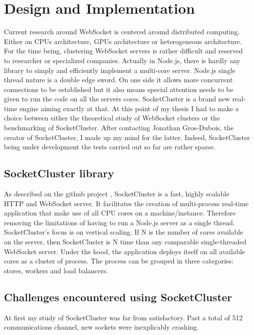 
\chapter{Design and Implementation} 
\label{Chapter2} 

Current research around WebSocket is centered around distributed computing. Either
on CPUs architecture, GPUs architecture or heterogeneous architecture. For the
time being, clustering WebSocket servers is rather difficult and reserved to
researcher or specialized companies. Actually in Node.js, there is hardly any
library to simply and efficiently implement a multi-core server.  Node.js
single thread nature is a double edge sword. On one side it allows more
concurrent connections to be established but it also means special attention
needs to be given to run the code on all the servers cores. SocketCluster is a
brand new real-time engine aiming exactly at that.  At this point of my thesis
I had to make a choice between either the theoretical study of WebSocket
clusters or the benchmarking of SocketCluster. After contacting Jonathan
Gros-Dubois, the creator of SocketCluster, I made up my mind for the latter.
Indeed, SocketCluster being under development the tests carried out so far are
rather sparse. 

\section{SocketCluster library}

As described on the github project  \citep{Reference38}, SocketCluster is a
fast, highly scalable HTTP and WebSocket server. It facilitates the creation of
multi-process real-time application that make use of all CPU cores on a
machine/instance. Therefore removing the limitations of having to run a Node.js
server as a single thread.  SocketCluster's focus is on vertical scaling. If N
is the number of cores available on the server, then SocketCluster is N time
than any comparable single-threaded WebSocket server. Under the hood, the
application deploys itself on all available cores as a cluster of process. The
process can be grouped in three categories: stores, workers and load balancers.

\section{Challenges encountered using SocketCluster}

At first my study of SocketCluster was far from satisfactory. Past a
total of 512 communications channel, new sockets were inexplicably crashing.

